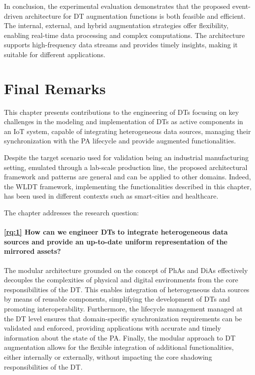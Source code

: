 In conclusion, the experimental evaluation demonstrates that the proposed event-driven architecture for DT augmentation functions is both feasible and efficient.
The internal, external, and hybrid augmentation strategies offer flexibility, enabling real-time data processing and complex computations.
The architecture supports high-frequency data streams and provides timely insights, making it suitable for different applications.


\section{Final Remarks}

This chapter presents contributions to the engineering of \acp{DT} focusing on key challenges in the modeling and implementation of \acp{DT} as active components in an \ac{IoT} system, capable of integrating heterogeneous data sources, managing their synchronization with the \ac{PA} lifecycle and provide augmented functionalities. 

Despite the target scenario used for validation being an industrial manufacturing setting, emulated through a lab-scale production line, the proposed architectural framework and patterns are general and can be applied to other domains.
%
Indeed, the \ac{WLDT} framework, implementing the functionalities described in this chapter, has been used in different contexts such as smart-cities and healthcare. 

The chapter addresses the research question:

\paragraph{\ref{rq:1} How can we engineer \acp{DT} to integrate heterogeneous data sources and provide an up-to-date uniform representation of the mirrored assets?}
%
The modular architecture grounded on the concept of \acp{PhA} and \acp{DiA} effectively decouples the complexities of physical and digital environments from the core responsibilities of the \ac{DT}.
%
This enables integration of heterogeneous data sources by means of reusable components, simplifying the development of \acp{DT} and promoting interoperability.
%
Furthermore, the lifecycle management managed at the \ac{DT} level ensures that domain-specific synchronization requirements can be validated and enforced, providing applications with accurate and timely information about the state of the \ac{PA}.
%
Finally, the modular approach to \ac{DT} augmentation allows for the flexible integration of additional functionalities, either internally or externally, without impacting the core shadowing responsibilities of the \ac{DT}.
